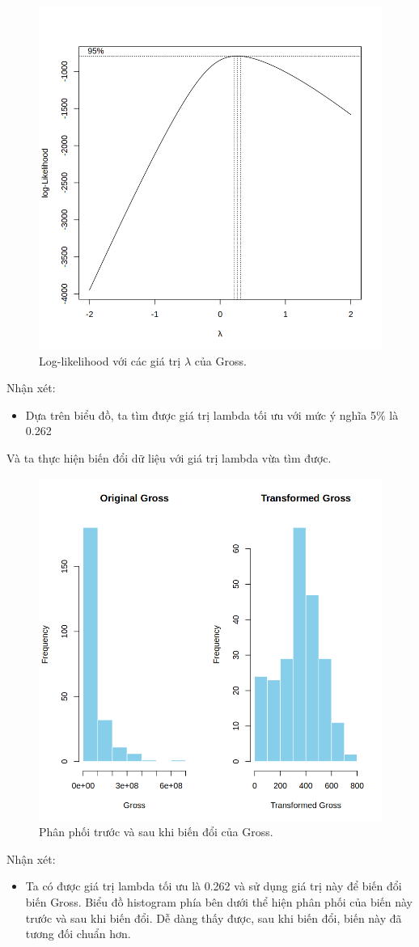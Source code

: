 \begin{figure}[H]
    \centering
    \includegraphics[width=0.75\columnwidth]{csm_figures/gross_optimal_lambda.png}
    \caption{Log-likelihood với các giá trị $\lambda$ của Gross.}
    \label{fig:gross_optimal_lambda}
\end{figure}
Nhận xét:
\begin{itemize}
    \item Dựa trên biểu đồ, ta tìm được giá trị lambda tối ưu với mức ý nghĩa 5\% là 0.262
\end{itemize}

Và ta thực hiện biến đổi dữ liệu với giá trị lambda vừa tìm được.
\begin{figure}[H]
    \centering
    \includegraphics[width=0.75\columnwidth]{csm_figures/gross_transformed_distribution.png}
    \caption{Phân phối trước và sau khi biến đổi của Gross.}
    \label{fig:gross_transformed_distribution}
\end{figure}
Nhận xét:
\begin{itemize}
    \item Ta có được giá trị lambda tối ưu là 0.262 và sử dụng giá trị này để biến đổi biến Gross. Biểu đồ histogram phía bên dưới thể hiện phân phối của biến này trước và sau khi biến đổi. Dễ dàng thấy được, sau khi biến đổi, biến này đã tương đối chuẩn hơn.
\end{itemize}

